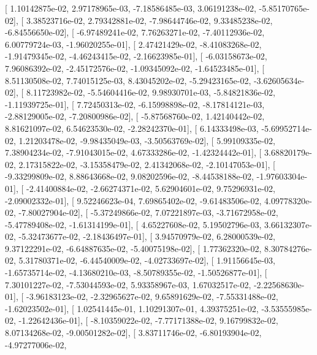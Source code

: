 \documentclass{article}
\begin{document}
       [  1.10142875e-02,   2.97178965e-03,  -7.18586485e-03,
          3.06191238e-02,  -5.85170765e-02],
       [  3.38523716e-02,   2.79342881e-02,  -7.98644746e-02,
          9.33485238e-02,  -6.84556650e-02],
       [ -6.97489241e-02,   7.76263271e-02,  -7.40112936e-02,
          6.00779724e-03,  -1.96020255e-01],
       [  2.47421429e-02,  -8.41083268e-02,  -1.91479345e-02,
         -4.46243415e-02,  -2.16623985e-01],
       [ -6.03158673e-02,   7.96086392e-02,  -2.45172576e-02,
         -1.09345092e-02,  -1.64523485e-01],
       [  8.51130508e-02,   7.74015125e-03,   8.43045202e-02,
         -5.29423165e-02,  -3.62605634e-02],
       [  8.11723982e-02,  -5.54604416e-02,   9.98930701e-03,
         -5.84821836e-02,  -1.11939725e-01],
       [  7.72450313e-02,  -6.15998898e-02,  -8.17814121e-03,
         -2.88129005e-02,  -7.20800986e-02],
       [ -5.87568760e-02,   1.42140442e-02,   8.81621097e-02,
          6.54623530e-02,  -2.28242370e-01],
       [  6.14333498e-03,  -5.69952714e-02,   1.21203478e-02,
         -9.98435049e-03,  -3.50563769e-02],
       [  5.99109335e-02,   7.38904234e-02,  -7.91043015e-02,
          4.67333286e-02,  -1.42324442e-01],
       [  3.68820179e-02,   2.17315822e-02,  -3.15358479e-02,
          2.41342068e-02,  -2.10147053e-01],
       [ -9.33299809e-02,   8.88643668e-02,   9.08202596e-02,
         -8.44538188e-02,  -1.97603304e-01],
       [ -2.41400884e-02,  -2.66274371e-02,   5.62904601e-02,
          9.75296931e-02,  -2.09002332e-01],
       [  9.52246623e-04,   7.69865402e-02,  -9.61483506e-02,
          4.09778320e-02,  -7.80027904e-02],
       [ -5.37249866e-02,   7.07221897e-03,  -3.71672958e-02,
         -5.47789408e-02,  -1.61314199e-01],
       [  4.65227608e-02,   5.19502796e-03,   3.66132307e-02,
         -5.32473677e-02,  -2.18436497e-01],
       [  3.94570979e-02,   6.28000539e-02,   9.37122291e-02,
         -6.64887635e-02,  -5.40075198e-02],
       [  1.77362320e-02,   8.30784276e-02,   5.31780371e-02,
         -6.44540009e-02,  -4.02733697e-02],
       [  1.91156645e-03,  -1.65735714e-02,  -4.13680210e-03,
         -8.50789355e-02,  -1.50526877e-01],
       [  7.30101227e-02,  -7.53044593e-02,   5.93358967e-03,
          1.67032517e-02,  -2.22568630e-01],
       [ -3.96183123e-02,  -2.32965627e-02,   9.65891629e-02,
         -7.55331488e-02,  -1.62023502e-01],
       [  1.02541445e-01,   1.10291307e-01,   4.39375251e-02,
         -3.53555985e-02,  -1.22642436e-01],
       [ -8.10359022e-02,  -7.77171388e-02,   9.16799832e-02,
          8.07134268e-02,  -9.00501282e-02],
       [  3.83711746e-02,  -6.80193904e-02,  -4.97277006e-02,
\end{document}
